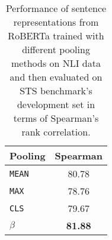 \begin{table}[t]
	\centering 
	\footnotesize
	\begin{tabular}{l|c}
		\toprule
		\textbf{Pooling} & \textbf{Spearman} \\ \midrule
		\texttt{MEAN} & 80.78 \\
		\texttt{MAX} & 78.76 \\
		\texttt{CLS} &  79.67 \\
		$\beta$ \text{ (ours)} & \textbf{81.88} \\
		\bottomrule
	\end{tabular}
	\caption{Performance of sentence representations from RoBERTa trained with different pooling methods on NLI data and then evaluated on STS benchmark's development set %
	in terms of Spearman's rank correlation.}
	\label{tab:pooling}
\end{table}

% 




